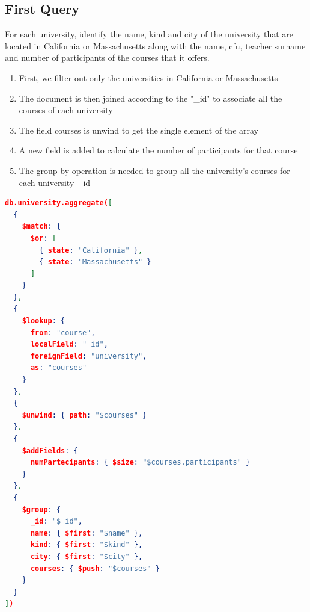 \documentclass[pdflatex,sn-mathphys-num]{sn-jnl}
\begin{document}
\subsection{First Query}
For each university, identify the name, kind and city of the university that are located in California or Massachusetts along with the name, cfu, teacher surname and number of participants of the courses that it offers.
\begin{enumerate}[label=(\alph*)]
\item First, we filter out only the universities in California or Massachusetts
\item The document is then joined according to the "\_id" to associate all the courses of each university
\item The field courses is unwind to get the single element of the array
\item A new field is added to calculate the number of participants for that course
\item The group by operation is needed to group all the university's courses for each university \_id
\end{enumerate}
\begin{lstlisting}[language=json]
db.university.aggregate([
  {
    $match: {
      $or: [
        { state: "California" },
        { state: "Massachusetts" }
      ]
    }
  },
  {
    $lookup: {
      from: "course",
      localField: "_id",
      foreignField: "university",
      as: "courses"
    }
  },
  {
    $unwind: { path: "$courses" }
  },
  {
    $addFields: {
      numPartecipants: { $size: "$courses.participants" }
    }
  },
  {
    $group: {
      _id: "$_id",
      name: { $first: "$name" },
      kind: { $first: "$kind" },
      city: { $first: "$city" },
      courses: { $push: "$courses" }
    }
  }
])
\end{lstlisting}
\end{document}
